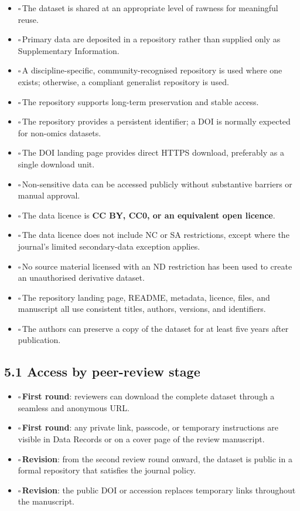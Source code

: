 \documentclass[11pt]{article}
\newcommand{\cbox}{$\square$\,}
\newcommand{\firstround}{\textcolor{teal!70!black}{\textbf{First round}}}
\newcommand{\revision}{\textcolor{violet!75!black}{\textbf{Revision}}}
\begin{document}
\begin{itemize}
    \item \cbox The dataset is shared at an appropriate level of rawness for meaningful reuse.
    \item \cbox Primary data are deposited in a repository rather than supplied only as Supplementary Information.
    \item \cbox A discipline-specific, community-recognised repository is used where one exists; otherwise, a compliant generalist repository is used.
    \item \cbox The repository supports long-term preservation and stable access.
    \item \cbox The repository provides a persistent identifier; a DOI is normally expected for non-omics datasets.
    \item \cbox The DOI landing page provides direct HTTPS download, preferably as a single download unit.
    \item \cbox Non-sensitive data can be accessed publicly without substantive barriers or manual approval.
    \item \cbox The data licence is \textbf{CC BY, CC0, or an equivalent open licence}.
    \item \cbox The data licence does not include NC or SA restrictions, except where the journal's limited secondary-data exception applies.
    \item \cbox No source material licensed with an ND restriction has been used to create an unauthorised derivative dataset.
    \item \cbox The repository landing page, README, metadata, licence, files, and manuscript all use consistent titles, authors, versions, and identifiers.
    \item \cbox The authors can preserve a copy of the dataset for at least five years after publication.
\end{itemize}

\subsection*{5.1 Access by peer-review stage}

\begin{itemize}
    \item \cbox \firstround: reviewers can download the complete dataset through a seamless and anonymous URL.
    \item \cbox \firstround: any private link, passcode, or temporary instructions are visible in Data Records or on a cover page of the review manuscript.
    \item \cbox \revision: from the second review round onward, the dataset is public in a formal repository that satisfies the journal policy.
    \item \cbox \revision: the public DOI or accession replaces temporary links throughout the manuscript.
\end{itemize}
\end{document}
